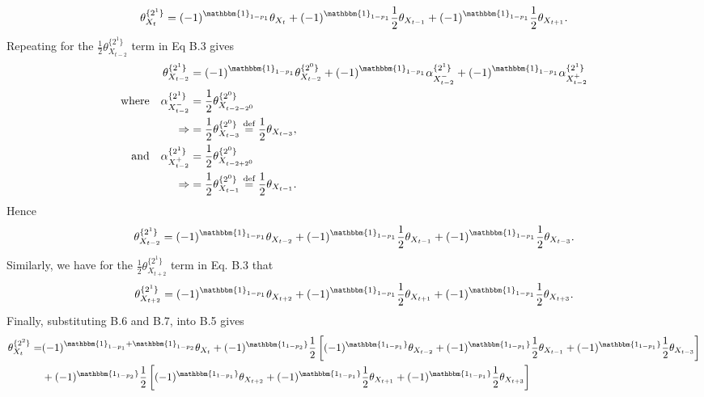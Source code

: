 \documentclass[english]{article}
\begin{document}
\begin{appendices}
\begin{equation}
    \theta^{\{2^1\}}_{X_{t}}=(-1)^{\mathbbm{1}_{1-p_1}}\theta_{X_{t}}+(-1)^{\mathbbm{1}_{1-p_1}}\frac{1}{2}\theta_{X_{t-1}}+(-1)^{\mathbbm{1}_{1-p_1}}\frac{1}{2}\theta_{X_{t+1}}.
\end{equation}
Repeating for the $\frac{1}{2}\theta^{\{2^1\}}_{X_{t-2}}$ term in Eq B.3 gives
\begin{align}\nonumber
    \theta^{\{2^1\}}_{X_{t-2}}&=(-1)^{\mathbbm{1}_{1-p_1}}\theta^{\{2^0\}}_{X_{t-2}}+(-1)^{\mathbbm{1}_{1-p_1}}\alpha^{\{2^1\}}_{X^-_{t-2}}+(-1)^{\mathbbm{1}_{1-p_1}}\alpha^{\{2^1\}}_{X^+_{t-2}}\\\nonumber
    \text{where}\quad\alpha^{\{2^1\}}_{X^-_{t-2}}&=\frac{1}{2}\theta^{\{2^0\}}_{X_{t-2-2^0}}\\\nonumber
    \Rightarrow&=\frac{1}{2}\theta^{\{2^0\}}_{X_{t-3}}\stackrel{\text{def}}{=}\frac{1}{2}\theta_{X_{t-3}},\\\nonumber
    \text{and} \quad\alpha^{\{2^1\}}_{X^+_{t-2}}&=\frac{1}{2}\theta^{\{2^0\}}_{X_{t-2+2^0}}\\\nonumber
    \Rightarrow&=\frac{1}{2}\theta^{\{2^0\}}_{X_{t-1}}\stackrel{\text{def}}{=}\frac{1}{2}\theta_{X_{t-1}}.
\end{align}
Hence
\begin{equation}
    \theta^{\{2^1\}}_{X_{t-2}}=(-1)^{\mathbbm{1}_{1-p_1}}\theta_{X_{t-2}}+(-1)^{\mathbbm{1}_{1-p_1}}\frac{1}{2}\theta_{X_{t-1}}+(-1)^{\mathbbm{1}_{1-p_1}}\frac{1}{2}\theta_{X_{t-3}}.
\end{equation}
Similarly, we have for the $\frac{1}{2}\theta^{\{2^1\}}_{X_{t+2}}$ term in Eq. B.3 that
\begin{equation}
    \theta^{\{2^1\}}_{X_{t+2}}=(-1)^{\mathbbm{1}_{1-p_1}}\theta_{X_{t+2}}+(-1)^{\mathbbm{1}_{1-p_1}}\frac{1}{2}\theta_{X_{t+1}}+(-1)^{\mathbbm{1}_{1-p_1}}\frac{1}{2}\theta_{X_{t+3}}.\\
\end{equation}
Finally, substituting B.6 and B.7, into B.5 gives
\begin{align}\nonumber
\theta^{\{2^2\}}_{X_t}=&(-1)^{\mathbbm{1}_{1-p_1}+\mathbbm{1}_{1-p_2}}\theta_{X_t}+(-1)^\mathbbm{{1}_{1-p_2}}\frac{1}{2}\left[(-1)^\mathbbm{{1}_{1-p_1}}\theta_{X_{t-2}}+(-1)^\mathbbm{{1}_{1-p_1}}\frac{1}{2}\theta_{X_{t-1}}+(-1)^\mathbbm{{1}_{1-p_1}}\frac{1}{2}\theta_{X_{t-3}}\right]\\
&+(-1)^\mathbbm{{1}_{1-p_2}}\frac{1}{2}\left[(-1)^\mathbbm{{1}_{1-p_1}}\theta_{X_{t+2}}+(-1)^\mathbbm{{1}_{1-p_1}}\frac{1}{2}\theta_{X_{t+1}}+(-1)^\mathbbm{{1}_{1-p_1}}\frac{1}{2}\theta_{X_{t+3}}\right]
\end{align}


\end{appendices}
\end{document}
